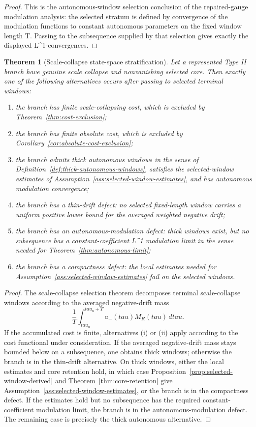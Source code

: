 \documentclass[11pt]{amsart}
\def\({}%
\def\){}%
\def\tau{tau}%
\theoremstyle{plain}
\newtheorem{theorem}{Theorem}[section]
\theoremstyle{definition}
\theoremstyle{remark}
\begin{document}
\begin{proof}
This is the autonomous-window selection conclusion of the repaired-gauge modulation analysis:
the selected stratum is defined by convergence of the modulation functions to constant
autonomous parameters on the fixed window length \(T\).  Passing to the subsequence supplied by
that selection gives exactly the displayed \(L^1\)-convergences.
\end{proof}

\begin{theorem}[Scale-collapse state-space stratification]\label{thm:scale-collapse-stratification}
Let a represented Type II branch have genuine scale collapse and nonvanishing selected core.
Then exactly one of the following alternatives occurs after passing to selected terminal
windows:
\begin{enumerate}[label=(\roman*)]
  \item the branch has finite scale-collapsing cost, which is excluded by
  Theorem~\ref{thm:cost-exclusion};
  \item the branch has finite absolute cost, which is excluded by
  Corollary~\ref{cor:absolute-cost-exclusion};
  \item the branch admits thick autonomous windows in the sense of
  Definition~\ref{def:thick-autonomous-windows}, satisfies the selected-window estimates of
  Assumption~\ref{ass:selected-window-estimates}, and has autonomous modulation convergence;
  \item the branch has a thin-drift defect: no selected fixed-length window carries a uniform
  positive lower bound for the averaged weighted negative drift;
  \item the branch has an autonomous-modulation defect: thick windows exist, but no subsequence
  has a constant-coefficient \(L^1\) modulation limit in the sense needed for
  Theorem~\ref{thm:autonomous-limit};
  \item the branch has a compactness defect: the local estimates needed for
  Assumption~\ref{ass:selected-window-estimates} fail on the selected windows.
\end{enumerate}
\end{theorem}

\begin{proof}
The scale-collapse selection theorem decomposes terminal scale-collapse windows according to the
averaged negative-drift mass
\[
  \frac1T\int_{\tau_n}^{\tau_n+T}a_-(\tau)M_R(\tau)\,d\tau.
\]
If the accumulated cost is finite, alternatives (i) or (ii) apply according to the cost
functional under consideration.  If the averaged negative-drift mass stays bounded below on a
subsequence, one obtains thick windows; otherwise the branch is in the thin-drift alternative.
On thick windows, either the local estimates and core retention hold, in which case
Proposition~\ref{prop:selected-window-derived} and Theorem~\ref{thm:core-retention} give
Assumption~\ref{ass:selected-window-estimates}, or the branch is in the compactness defect.  If
the estimates hold but no subsequence has the required constant-coefficient modulation limit,
the branch is in the autonomous-modulation defect.  The remaining case is precisely the thick
autonomous alternative.
\end{proof}
\end{document}

